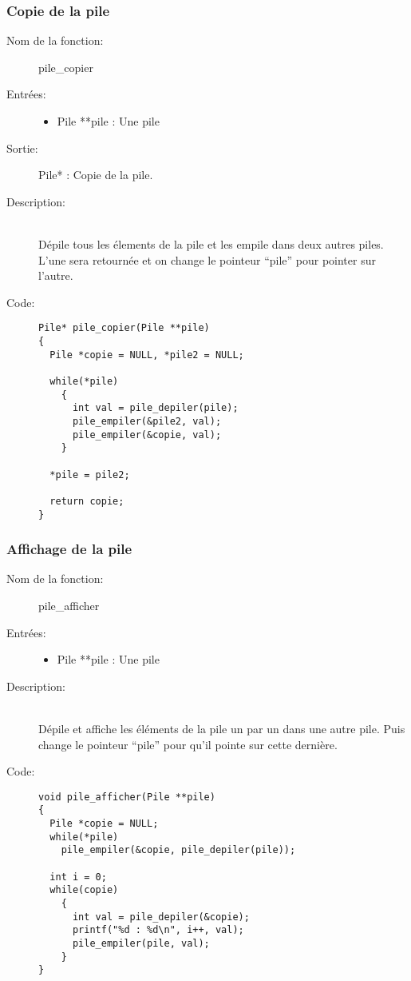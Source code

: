 \documentclass[a4paper]{article}
\begin{document}
\subsubsection{Copie de la pile}
\begin{description}
  \item[Nom de la fonction:] pile\_copier

  \item[Entrées:] \hfill
    \begin{itemize}
      \item Pile **pile : Une pile
    \end{itemize}

  \item[Sortie:] \hfill
    Pile* : Copie de la pile.

  \item[Description:] \hfill \\ 
    Dépile tous les élements de la pile et les empile dans deux autres piles.
    L'une sera retournée et on change le pointeur ``pile'' pour pointer 
    sur l'autre.

  \item[Code:] \hfill
  \begin{lstlisting}
Pile* pile_copier(Pile **pile)
{
  Pile *copie = NULL, *pile2 = NULL;

  while(*pile)
    {
      int val = pile_depiler(pile);
      pile_empiler(&pile2, val);
      pile_empiler(&copie, val);
    }

  *pile = pile2;

  return copie;
}
  \end{lstlisting}

\end{description}


\subsubsection{Affichage de la pile}
\begin{description}
  \item[Nom de la fonction:] pile\_afficher

  \item[Entrées:] \hfill
    \begin{itemize}
      \item Pile **pile : Une pile
    \end{itemize}

  \item[Description:] \hfill \\ 
    Dépile et affiche les éléments de la pile un par un dans une autre pile.
    Puis change le pointeur ``pile'' pour qu'il pointe sur cette dernière.

  \item[Code:] \hfill 
  \begin{lstlisting}
void pile_afficher(Pile **pile)
{
  Pile *copie = NULL;
  while(*pile)
    pile_empiler(&copie, pile_depiler(pile));

  int i = 0;
  while(copie)
    {
      int val = pile_depiler(&copie);
      printf("%d : %d\n", i++, val);
      pile_empiler(pile, val);
    }
}
  \end{lstlisting}

\end{description}
\end{document}
